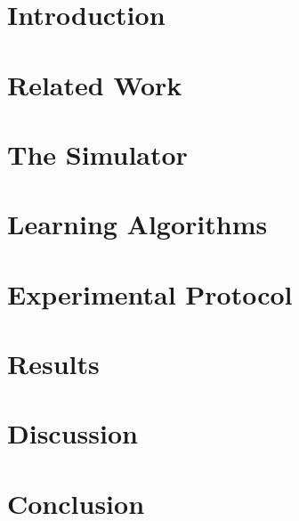 
\section{Introduction}\label{sec:intro}


\section{Related Work}\label{sec:related}


\section{The Simulator}\label{sec:sim}


\section{Learning Algorithms}\label{sec:learners}


\section{Experimental Protocol}\label{sec:protocol}


\section{Results}\label{sec:results}


\section{Discussion}\label{sec:discussion}


\section{Conclusion}\label{sec:conclusion}

